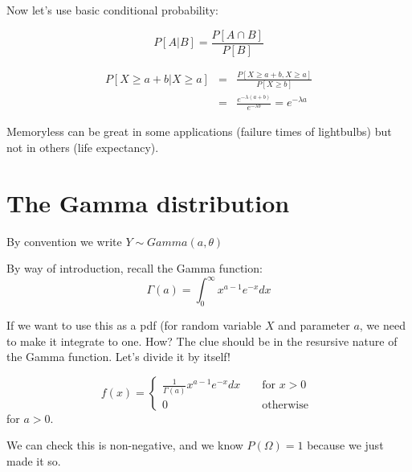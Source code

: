 \documentclass[12pt]{extbook}
\begin{document}
Now let's use basic conditional probability:

\begin{displaymath}
P[A|B] = \frac{P[A \cap B]}{P[B]}
\end{displaymath}


\begin{eqnarray*}
P[X \geq a+b | X \geq a] &=& \frac{P[X \geq a+b, X \geq a]}{P[X \geq b]}\\
&=& \frac{e^{-\lambda(a+b)}}{e^{-\lambda b}} = e^{-\lambda a}
\end{eqnarray*}





Memoryless can be great in some applications (failure times of lightbulbs) but not in others (life expectancy).




\section{The Gamma distribution}

{\color{green} By convention we write $Y \sim Gamma(a,\theta)$}

By way of introduction, recall the Gamma function:
\begin{displaymath}
\Gamma (a) = \int_0^{\infty} x^{a-1} e^{-x} dx
\end{displaymath}

If we want to use this as a pdf (for random variable $X$ and parameter $a$, we need to make it integrate to one.   How?   The clue should be in the resursive nature of the Gamma function.   Let's divide it by itself!

\begin{displaymath}
f(x) =  \left\{ \begin{array}{rrr} \frac{1}{\Gamma (a)} x^{a-1} e^{-x} dx & & \mbox{ for } x>0 \\ 0 & & \mbox{ otherwise } \end{array} \right.
\end{displaymath}
for $a>0$.

We can check this is non-negative, and we know $P(\Omega)=1$ because we just made it so.
\end{document}
